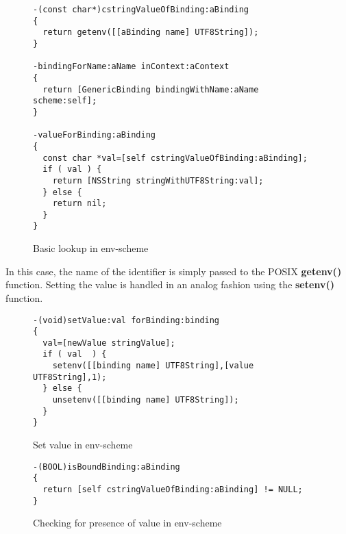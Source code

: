 \documentclass[preprint,authoryear]{acm_proc_article-sp}
\begin{document}
     
\begin{figure}[htbp]
\begin{center}
\begin{small}
\begin{verbatim}
-(const char*)cstringValueOfBinding:aBinding
{
  return getenv([[aBinding name] UTF8String]);
}

-bindingForName:aName inContext:aContext
{
  return [GenericBinding bindingWithName:aName scheme:self];
}

-valueForBinding:aBinding
{
  const char *val=[self cstringValueOfBinding:aBinding];
  if ( val ) {
    return [NSString stringWithUTF8String:val];
  } else {
    return nil;
  }
}
\end{verbatim}
\end{small}
\caption{Basic lookup in env-scheme}
\label{get-env}
\end{center}
\end{figure}

In this case, the name of the identifier is simply passed to the POSIX {\bf getenv()} function.
Setting the value is handled in an analog fashion using the {\bf setenv()} function.



\begin{figure}[htbp]
\begin{center}
\begin{small}
\begin{verbatim}
-(void)setValue:val forBinding:binding
{
  val=[newValue stringValue];
  if ( val  ) {
    setenv([[binding name] UTF8String],[value UTF8String],1);
  } else {
    unsetenv([[binding name] UTF8String]);
  }
}
\end{verbatim}
\end{small}
\caption{Set value in env-scheme}
\label{setvalue-env}
\end{center}
\end{figure}

\begin{figure}[htbp]
\begin{center}
\begin{small}
\begin{verbatim}
-(BOOL)isBoundBinding:aBinding
{
  return [self cstringValueOfBinding:aBinding] != NULL;
}
\end{verbatim}
\end{small}
\caption{Checking for presence of value in env-scheme}
\label{hasValue-env}
\end{center}
\end{figure}
\end{document}
